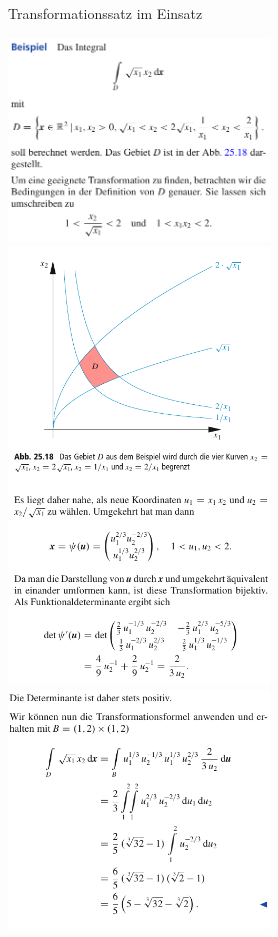 \begin{Beispiel}{Transformationssatz im Einsatz}
            \begin{center}
    \includegraphics[width=0.52\textwidth]{Dateien/Transformationssatz1.png}
    \includegraphics[width=0.52\textwidth]{Dateien/Transformationssatz2.png}
    \includegraphics[width=0.52\textwidth]{Dateien/Transformationssatz3.png}
\end{center}
\end{Beispiel}
\newpage
